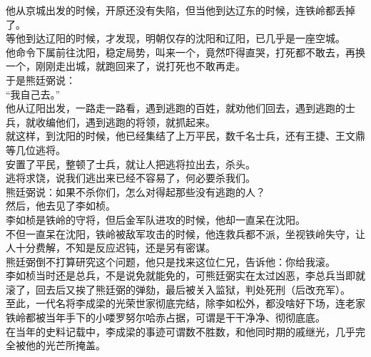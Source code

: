 \begin{multicols}{\theparacolNo}
他从京城出发的时候，开原还没有失陷，但当他到达辽东的时候，连铁岭都丢掉了。\\

等他到达辽阳的时候，才发现，明朝仅存的沈阳和辽阳，已几乎是一座空城。\\

他命令下属前往沈阳，稳定局势，叫来一个，竟然吓得直哭，打死都不敢去，再换一个，刚刚走出城，就跑回来了，说打死也不敢再走。\\

于是熊廷弼说：\\

“我自己去。”\\

他从辽阳出发，一路走一路看，遇到逃跑的百姓，就劝他们回去，遇到逃跑的士兵，就收编他们，遇到逃跑的将领，就抓起来。\\

就这样，到沈阳的时候，他已经集结了上万平民，数千名士兵，还有王捷、王文鼎等几位逃将。\\

安置了平民，整顿了士兵，就让人把逃将拉出去，杀头。\\

逃将求饶，说我们逃出来已经不容易了，何必要杀我们。\\

熊廷弼说：如果不杀你们，怎么对得起那些没有逃跑的人？\\

然后，他去见了李如桢。\\

李如桢是铁岭的守将，但后金军队进攻的时候，他却一直呆在沈阳。\\

不但一直呆在沈阳，铁岭被敌军攻击的时候，他连救兵都不派，坐视铁岭失守，让人十分费解，不知是反应迟钝，还是另有密谋。\\

熊廷弼倒不打算研究这个问题，他只是找来这位仁兄，告诉他：你给我滚。\\

李如桢当时还是总兵，不是说免就能免的，可熊廷弼实在太过凶恶，李总兵当即就滚了，回去后又挨了熊廷弼的弹劾，最后被关入监狱，判处死刑（后改充军）。\\

至此，一代名将李成梁的光荣世家彻底完结，除李如松外，都没啥好下场，连老家铁岭都被当年手下的小喽罗努尔哈赤占据，可谓是干干净净、彻彻底底。\\

在当年的史料记载中，李成梁的事迹可谓数不胜数，和他同时期的戚继光，几乎完全被他的光芒所掩盖。\\


\end{multicols}
